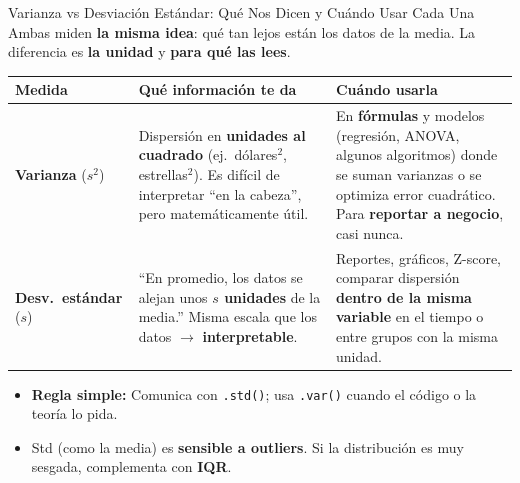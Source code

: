 \documentclass[aspectratio=169, 11pt]{beamer}
\begin{document}
\begin{frame}[shrink=10]{Varianza vs Desviación Estándar: Qué Nos Dicen y Cuándo Usar Cada Una}
  \vspace{-4pt}
  {\footnotesize
    Ambas miden \textbf{la misma idea}: qué tan lejos están los datos de la media.
    La diferencia es \textbf{la unidad} y \textbf{para qué las lees}.}

  \vspace{6pt}
  {\scriptsize
  \begin{tabular}{@{}p{2.8cm}p{5.2cm}p{5.5cm}@{}}
    \toprule
    \textbf{Medida} & \textbf{Qué información te da} & \textbf{Cuándo usarla} \\
    \midrule
    \textbf{Varianza} ($s^2$) &
      Dispersión en \textbf{unidades al cuadrado} (ej.\ dólares$^2$, estrellas$^2$).
      Es difícil de interpretar ``en la cabeza'', pero matemáticamente útil. &
      En \textbf{fórmulas} y modelos (regresión, ANOVA, algunos algoritmos) donde se suman varianzas o se optimiza error cuadrático.
      Para \textbf{reportar a negocio}, casi nunca. \\
    \textbf{Desv.\ estándar} ($s$) &
      ``En promedio, los datos se alejan unos \textbf{$s$ unidades} de la media.''
      Misma escala que los datos $\to$ \textbf{interpretable}. &
      Reportes, gráficos, Z-score, comparar dispersión \textbf{dentro de la misma variable} en el tiempo o entre grupos con la misma unidad. \\
    \bottomrule
  \end{tabular}
  }

  \vspace{6pt}
  {\scriptsize\color{textMuted}
  \begin{itemize}\setlength{\itemsep}{3pt}
    \item[{\color{codeGreen}\scriptsize\faCheckCircle}]
      \textbf{Regla simple:} Comunica con \texttt{.std()}; usa \texttt{.var()} cuando el código o la teoría lo pida.
    \item[{\color{codeOrange}\scriptsize\faExclamationTriangle}]
      Std (como la media) es \textbf{sensible a outliers}. Si la distribución es muy sesgada, complementa con \textbf{IQR}.
  \end{itemize}
  }
\end{frame}
\end{document}
